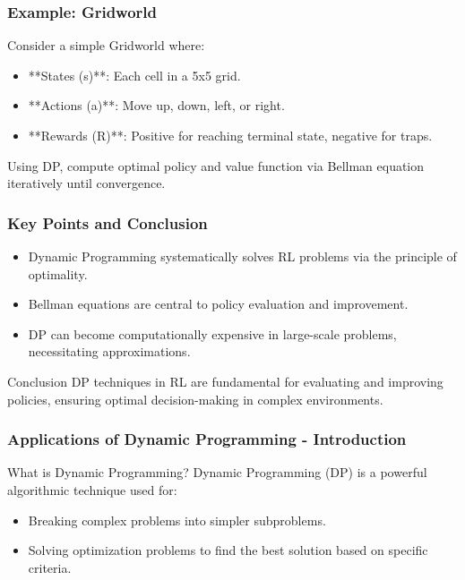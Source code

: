 \documentclass[aspectratio=169]{beamer}
\begin{document}
\begin{frame}[fragile]
  \frametitle{Example: Gridworld}
  
  Consider a simple Gridworld where:
  
  \begin{itemize}
    \item **States (s)**: Each cell in a 5x5 grid.
    \item **Actions (a)**: Move up, down, left, or right.
    \item **Rewards (R)**: Positive for reaching terminal state, negative for traps.
  \end{itemize}
  
  Using DP, compute optimal policy and value function via Bellman equation iteratively until convergence.
\end{frame}

\begin{frame}[fragile]
  \frametitle{Key Points and Conclusion}
  
  \begin{itemize}
    \item Dynamic Programming systematically solves RL problems via the principle of optimality.
    \item Bellman equations are central to policy evaluation and improvement.
    \item DP can become computationally expensive in large-scale problems, necessitating approximations.
  \end{itemize}
  
  \begin{block}{Conclusion}
    DP techniques in RL are fundamental for evaluating and improving policies, ensuring optimal decision-making in complex environments.
  \end{block}
\end{frame}

\begin{frame}[fragile]
    \frametitle{Applications of Dynamic Programming - Introduction}
    \begin{block}{What is Dynamic Programming?}
        Dynamic Programming (DP) is a powerful algorithmic technique used for:
        \begin{itemize}
            \item Breaking complex problems into simpler subproblems.
            \item Solving optimization problems to find the best solution based on specific criteria.
        \end{itemize}
    \end{block}
\end{frame}
\end{document}
